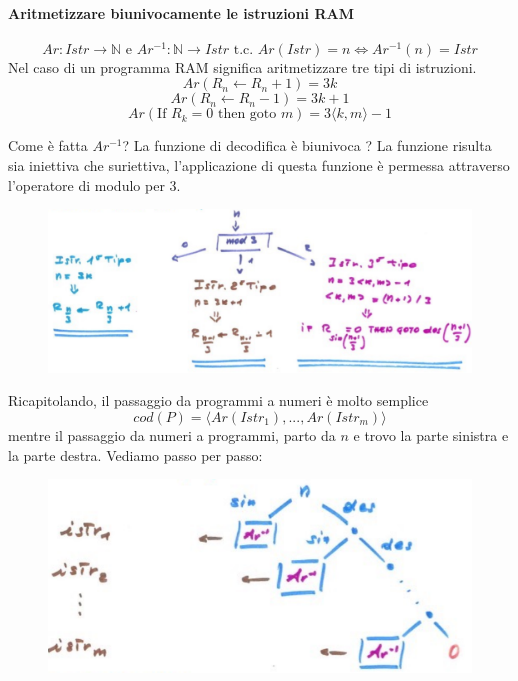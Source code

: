 \documentclass{article}
\begin{document}
\paragraph{Aritmetizzare biunivocamente le istruzioni RAM}
$$Ar:Istr\rightarrow\mathbb{N}\text{ e }Ar^{-1}:\mathbb{N}\rightarrow Istr\text{ t.c. }
    Ar(Istr)=n\Leftrightarrow Ar^{-1}(n)=Istr$$
Nel caso di un programma RAM significa aritmetizzare tre tipi di istruzioni.
$$Ar(R_n\leftarrow R_n+1)=3k$$
$$Ar(R_n\leftarrow R_n-1)=3k+1$$
$$Ar(\text{If }R_k=0\text{ then goto }m)=3\langle k,m\rangle-1$$

Come è fatta $Ar^{-1}$? La funzione di decodifica è biunivoca ? La funzione
risulta sia iniettiva che suriettiva, l'applicazione di questa funzione è permessa
attraverso l'operatore di modulo per $3$.
\begin{figure}[H]
    \centering
    \includegraphics[scale=0.4]{images/mod3.png}
\end{figure}

Ricapitolando, il passaggio da programmi a numeri è molto semplice
$$cod(P)=\langle Ar(Istr_1),...,Ar(Istr_m)\rangle$$
mentre il passaggio da numeri a programmi, parto da $n$ e trovo la parte sinistra e
la parte destra. Vediamo passo per passo:

\begin{figure}[H]
    \centering
    \includegraphics[scale=0.5]{images/decod_bin.png}
\end{figure}
\end{document}
